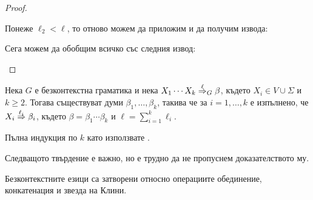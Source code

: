 \begin{proof}
\begin{itemize}
\begin{prooftree}
  \end{prooftree}
  Понеже $\ell_2 < \ell$, то отново можем да приложим \IndHyp и да получим извода:
  \begin{prooftree}
  \end{prooftree}
  Сега можем да обобщим всичко със следния извод:
  \begin{prooftree}
  \end{prooftree}
\end{itemize}
\end{proof}

\begin{proposition}\label{pr:grammar:divide}
  Нека $G$ е безконтекстна граматика и нека $X_1\cdots X_k \derive{\ell}_G \beta$, където $X_i \in V \cup \Sigma$ и $k \geq 2$.
  Тогава съществуват думи $\beta_1,\dots,\beta_k$, такива че за $i = 1,\dots, k$ е изпълнено, че
  $X_i \derive{\ell_i} \beta_i$, където $\beta = \beta_1\cdots \beta_k$ и $\ell = \sum^k_{i = 1}\ell_i$.
\end{proposition}
\begin{hint}
  Пълна индукция по $k$ като използвате .
\end{hint}

Следващото твърдение е важно, но е трудно да не пропуснем доказателството му.
\begin{important}
  \begin{proposition}
    Безконтекстните езици са затворени относно операциите обединение, конкатенация и звезда на Клини.
  \end{proposition}
\end{important}

